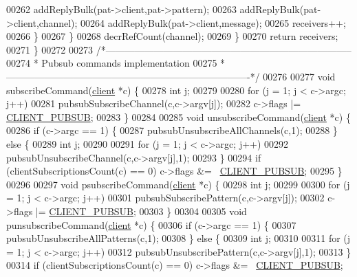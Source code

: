 \begin{DoxyCode}
00262                 addReplyBulk(pat->client,pat->pattern);
00263                 addReplyBulk(pat->client,channel);
00264                 addReplyBulk(pat->client,message);
00265                 receivers++;
00266             \}
00267         \}
00268         decrRefCount(channel);
00269     \}
00270     \textcolor{keywordflow}{return} receivers;
00271 \}
00272 
00273 \textcolor{comment}{/*-----------------------------------------------------------------------------}
00274 \textcolor{comment}{ * Pubsub commands implementation}
00275 \textcolor{comment}{ *----------------------------------------------------------------------------*/}
00276 
00277 \textcolor{keywordtype}{void} subscribeCommand(\hyperlink{structclient}{client} *c) \{
00278     \textcolor{keywordtype}{int} j;
00279 
00280     \textcolor{keywordflow}{for} (j = 1; j < c->argc; j++)
00281         pubsubSubscribeChannel(c,c->argv[j]);
00282     c->flags |= \hyperlink{server_8h_a20f2f5380db97cd09013118ffc9411cc}{CLIENT\_PUBSUB};
00283 \}
00284 
00285 \textcolor{keywordtype}{void} unsubscribeCommand(\hyperlink{structclient}{client} *c) \{
00286     \textcolor{keywordflow}{if} (c->argc == 1) \{
00287         pubsubUnsubscribeAllChannels(c,1);
00288     \} \textcolor{keywordflow}{else} \{
00289         \textcolor{keywordtype}{int} j;
00290 
00291         \textcolor{keywordflow}{for} (j = 1; j < c->argc; j++)
00292             pubsubUnsubscribeChannel(c,c->argv[j],1);
00293     \}
00294     \textcolor{keywordflow}{if} (clientSubscriptionsCount(c) == 0) c->flags &= ~\hyperlink{server_8h_a20f2f5380db97cd09013118ffc9411cc}{CLIENT\_PUBSUB};
00295 \}
00296 
00297 \textcolor{keywordtype}{void} psubscribeCommand(\hyperlink{structclient}{client} *c) \{
00298     \textcolor{keywordtype}{int} j;
00299 
00300     \textcolor{keywordflow}{for} (j = 1; j < c->argc; j++)
00301         pubsubSubscribePattern(c,c->argv[j]);
00302     c->flags |= \hyperlink{server_8h_a20f2f5380db97cd09013118ffc9411cc}{CLIENT\_PUBSUB};
00303 \}
00304 
00305 \textcolor{keywordtype}{void} punsubscribeCommand(\hyperlink{structclient}{client} *c) \{
00306     \textcolor{keywordflow}{if} (c->argc == 1) \{
00307         pubsubUnsubscribeAllPatterns(c,1);
00308     \} \textcolor{keywordflow}{else} \{
00309         \textcolor{keywordtype}{int} j;
00310 
00311         \textcolor{keywordflow}{for} (j = 1; j < c->argc; j++)
00312             pubsubUnsubscribePattern(c,c->argv[j],1);
00313     \}
00314     \textcolor{keywordflow}{if} (clientSubscriptionsCount(c) == 0) c->flags &= ~\hyperlink{server_8h_a20f2f5380db97cd09013118ffc9411cc}{CLIENT\_PUBSUB};

\end{DoxyCode}

